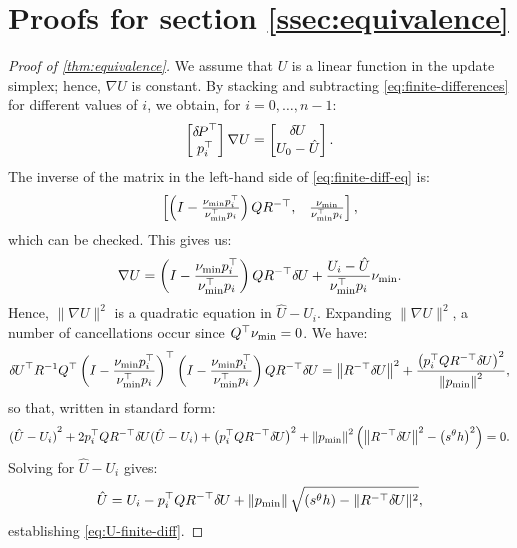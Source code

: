 \documentclass[sisc-eikonal.tex]{subfiles}
\begin{document}
\section{Proofs for section
  \ref{ssec:equivalence}}\label{sec:equivalence-proofs}

\begin{proof}[Proof of \cref{thm:equivalence}]
  We assume that $U$ is a linear function in the update simplex;
  hence, $\nabla U$ is constant. By stacking and subtracting
  \cref{eq:finite-differences} for different values of $i$, we obtain,
  for $i = 0, \hdots, n - 1$:
  \begin{equation}\label{eq:finite-diff-eq}
    \begin{bmatrix}
      \delP^\top \\
      p_i^\top
    \end{bmatrix} \nabla U = \begin{bmatrix}
      \delU \\
      U_0 - \hat{U}
    \end{bmatrix}.
  \end{equation}
  The inverse of the matrix in the left-hand side of \cref{eq:finite-diff-eq} is:
  \begin{equation}
    \begin{bmatrix}
      \left(I - \frac{\nu_{\operatorname{min}} p_i^\top}{\nu_{\operatorname{min}}^\top p_i}\right) Q R^{-\top}, &
      \frac{\nu_{\operatorname{min}}}{\nu_{\operatorname{min}}^\top p_i}
    \end{bmatrix},
  \end{equation}
  which can be checked. This gives us:
  \begin{equation}
    \nabla U = \left(I - \frac{\nu_{\operatorname{min}} p_i^\top}{\nu_{\operatorname{min}}^\top p_i}\right) Q R^{-\top} {\delta \hspace{-0.09em} U} + \frac{U_i - \hat{U}}{\nu_{\operatorname{min}}^\top p_i} \nu_{\operatorname{min}}.
  \end{equation}
  Hence, $\|\nabla U\|^2$ is a quadratic equation in
  $\hat{U} - U_i$. Expanding $\|\nabla U\|^2$, a number of
  cancellations occur since $Q^\top \nu_{\operatorname{min}} = 0$. We have:
  \begin{equation}
    {\delta \hspace{-0.09em} U}^\top R^{-1} Q^\top \left(I - \frac{\nu_{\operatorname{min}} p_i^\top}{\nu_{\operatorname{min}}^\top p_i}\right)^\top \left(I - \frac{\nu_{\operatorname{min}} p_i^\top}{\nu_{\operatorname{min}}^\top p_i}\right) Q R^{-\top} {\delta \hspace{-0.09em} U} = \left\|R^{-\top} {\delta \hspace{-0.09em} U}\right\|^2 + \frac{\left(p_i^\top Q R^{-\top} {\delta \hspace{-0.09em} U}\right)^2}{\left\|p_{\operatorname{min}}\right\|^2},
  \end{equation}
  so that, written in standard form:
  \begin{equation}
    {(\hat{U} - U_i)}^2 + 2 p_i^\top Q R^{-\top} {\delta \hspace{-0.09em} U} {(\hat{U} - U_i)} + \left(p_i^\top Q R^{-\top} {\delta \hspace{-0.09em} U}\right)^2 + \left\|p_{\operatorname{min}}\right\|^2 \left(\left\|R^{-\top} {\delta \hspace{-0.09em} U}\right\|^2 - \left(s^\theta h\right)^2\right) = 0.
  \end{equation}
  Solving for $\hat{U} - U_i$ gives:
  \begin{equation}
    \hat{U} = U_i - p_i^\top Q R^{-\top} {\delta \hspace{-0.09em} U} + \left\|p_{\operatorname{min}}\right\| \sqrt{\left(s^\theta h\right) - \|R^{-\top} {\delta \hspace{-0.09em} U}\|^2},
  \end{equation}
  establishing \cref{eq:U-finite-diff}.


\end{proof}
\end{document}
